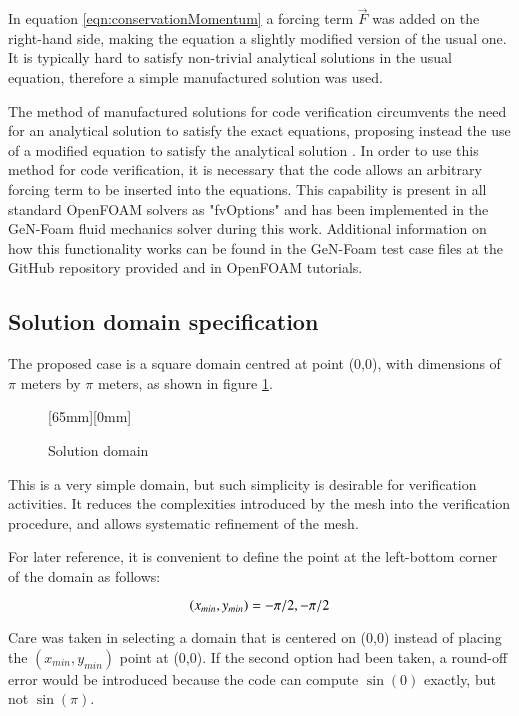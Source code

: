 In equation \ref{eqn:conservationMomentum} a forcing term $ \vec{F} $ was added on the right-hand side, making the equation a slightly modified version of the usual one.
It is typically hard to satisfy non-trivial analytical solutions in the usual equation, therefore a simple manufactured solution was used.

The method of manufactured solutions for code verification circumvents the need for an analytical solution to satisfy the exact equations, proposing instead the use of a modified equation to satisfy the analytical solution \cite{oberkampf_verification_2010, knupp_verification_2002, roache_verification_1998}.
In order to use this method for code verification, it is necessary that the code allows an arbitrary forcing term to be inserted into the equations.
This capability is present in all standard OpenFOAM solvers as "fvOptions" and has been implemented in the GeN-Foam fluid mechanics solver during this work.
Additional information on how this functionality works can be found in the GeN-Foam test case files at the GitHub repository provided and in OpenFOAM tutorials.

\subsection{Solution domain specification}

The proposed case is a square domain centred at point (0,0), with dimensions of $ \pi $ meters by $ \pi $ meters, as shown in figure \ref{fig:domain}.

\begin{figure}[htbp]
    \centering
    \raisebox{0mm}[65mm][0mm]{
    
    }
    \caption{Solution domain}
    \label{fig:domain}
\end{figure}

This is a very simple domain, but such simplicity is desirable for verification activities.
It reduces the complexities introduced by the mesh into the verification procedure, and allows systematic refinement of the mesh.

For later reference, it is convenient to define the point at the left-bottom corner of the domain as follows:

\begin{equation}
    \minimum
\end{equation}

Care was taken in selecting a domain that is centered on (0,0) instead of placing the $ (x_{min},y_{min}) $ point at (0,0).
If the second option had been taken, a round-off error would be introduced because the code can compute $\sin(0)$ exactly, but not $\sin(\pi)$.

